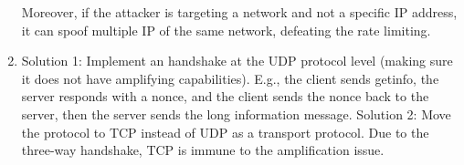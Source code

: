 \begin{enumerate}
        Moreover, if the attacker is targeting a network and not a specific IP address, it can spoof multiple IP of the same network, defeating the rate limiting.
    \item Solution 1: Implement an handshake at the UDP protocol level (making sure it does not have amplifying capabilities). 
        E.g., the client sends getinfo, the server responds with a nonce, and the client sends the nonce back to the server, then the server sends the long information message.
        Solution 2: Move the protocol to TCP instead of UDP as a transport protocol. 
        Due to the three-way handshake, TCP is immune to the amplification issue.
\end{enumerate}